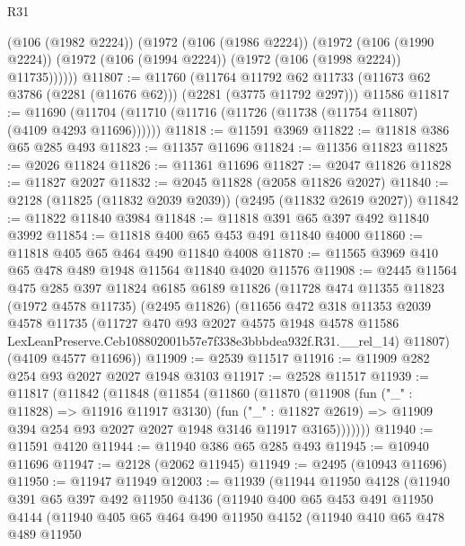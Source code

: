 \begin{lexlean}{R31}
\begin{coremodule}
        (@106 (@1982 @2224))
        (@1972
          (@106 (@1986 @2224))
          (@1972
            (@106 (@1990 @2224))
            (@1972 (@106 (@1994 @2224)) (@1972 (@106 (@1998 @2224)) @11735))))))
@11807 := @11760
    (@11764 @11792 @62 @11733 (@11673 @62 @3786 (@2281 (@11676 @62))) (@2281 (@3775 @11792 @297)))
    @11586
@11817 := @11690 (@11704 (@11710 (@11716 (@11726 (@11738 (@11754 @11807) (@4109 @4293 @11696))))))
@11818 := @11591 @3969
@11822 := @11818 @386 @65 @285 @493
@11823 := @11357 @11696
@11824 := @11356 @11823
@11825 := @2026 @11824
@11826 := @11361 @11696
@11827 := @2047 @11826
@11828 := @11827 @2027
@11832 := @2045 @11828 (@2058 @11826 @2027)
@11840 := @2128 (@11825 (@11832 @2039 @2039)) (@2495 (@11832 @2619 @2027))
@11842 := @11822 @11840 @3984
@11848 := @11818 @391 @65 @397 @492 @11840 @3992
@11854 := @11818 @400 @65 @453 @491 @11840 @4000
@11860 := @11818 @405 @65 @464 @490 @11840 @4008
@11870 := @11565 @3969 @410 @65 @478 @489 @1948 @11564 @11840 @4020 @11576
@11908 := @2445
    @11564
    @475
    @285
    @397
    @11824
    @6185
    @6189
    @11826
    (@11728
      @474
      @11355
      @11823
      (@1972 @4578 @11735)
      (@2495 @11826)
      (@11656
        @472
        @318
        @11353
        @2039
        @4578
        @11735
        (@11727
          @470
          @93
          @2027
          @4575
          @1948
          @4578
          @11586
          LexLeanPreserve.Ceb108802001b57e7f338e3bbbdea932f.R31.__rel_14)
        @11807)
      (@4109 @4577 @11696))
@11909 := @2539 @11517
@11916 := @11909 @282 @254 @93 @2027 @2027 @1948 @3103
@11917 := @2528 @11517
@11939 := @11817
    (@11842
      (@11848
        (@11854
          (@11860
            (@11870
              (@11908
                (fun ("_" : @11828) => @11916 @11917 @3130)
                (fun ("_" : @11827 @2619) =>
                @11909 @394 @254 @93 @2027 @2027 @1948 @3146 @11917 @3165)))))))
@11940 := @11591 @4120
@11944 := @11940 @386 @65 @285 @493
@11945 := @10940 @11696
@11947 := @2128 (@2062 @11945)
@11949 := @2495 (@10943 @11696)
@11950 := @11947 @11949
@12003 := @11939
    (@11944
      @11950
      @4128
      (@11940
        @391
        @65
        @397
        @492
        @11950
        @4136
        (@11940
          @400
          @65
          @453
          @491
          @11950
          @4144
          (@11940
            @405
            @65
            @464
            @490
            @11950
            @4152
            (@11940
              @410
              @65
              @478
              @489
              @11950

\end{coremodule}
\end{lexlean}
